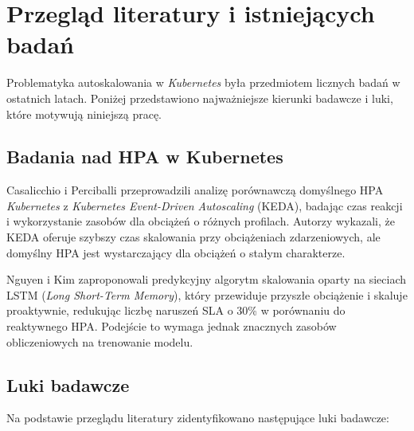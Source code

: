 \section{Przegląd literatury i istniejących badań}

Problematyka autoskalowania w \textit{Kubernetes} była przedmiotem licznych badań w ostatnich latach. Poniżej przedstawiono najważniejsze kierunki badawcze i luki, które motywują niniejszą pracę.

\subsection{Badania nad HPA w Kubernetes}

Casalicchio i Perciballi \cite{huawei2021} przeprowadzili analizę porównawczą domyślnego HPA \textit{Kubernetes} z \textit{Kubernetes Event-Driven Autoscaling} (KEDA), badając czas reakcji i wykorzystanie zasobów dla obciążeń o różnych profilach. Autorzy wykazali, że KEDA oferuje szybszy czas skalowania przy obciążeniach zdarzeniowych, ale domyślny HPA jest wystarczający dla obciążeń o stałym charakterze.

Nguyen i Kim \cite{nguyen2020} zaproponowali predykcyjny algorytm skalowania oparty na sieciach LSTM (\textit{Long Short-Term Memory}), który przewiduje przyszłe obciążenie i skaluje proaktywnie, redukując liczbę naruszeń SLA o 30\% w porównaniu do reaktywnego HPA. Podejście to wymaga jednak znacznych zasobów obliczeniowych na trenowanie modelu.

\subsection{Luki badawcze}

Na podstawie przeglądu literatury zidentyfikowano następujące luki badawcze:

